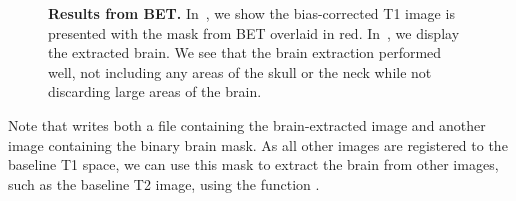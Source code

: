 \begin{figure}
\hfill
\caption{{\bf Results from BET.} In~\protect{}, we show the bias-corrected T1 image is presented with the mask from BET overlaid in red.  In~\protect{}, we display the extracted brain.  We see that the brain extraction performed well, not including any areas of the skull or the neck while not discarding large areas of the brain.}
\label{fig:bet}
\end{figure}

Note that  writes both a file containing the brain-extracted image and another image containing the binary brain mask.  As all other images are registered to the baseline T1 space, we can use this mask to extract the brain from other images, such as the baseline T2 image, using the  function .

\begin{knitrout}
\color{fgcolor}\begin{kframe}
\begin{alltt}
\hlstd{(}\hlstd{=}\hlstd{,}
         \hlstd{=} \hlstd{,}
         \hlstd{=} \hlstd{)}
\end{alltt}
\end{kframe}
\end{knitrout}
\gobblepars


